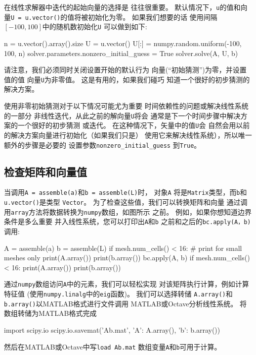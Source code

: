 在线性求解器中迭代的起始向量的选择是
往往很重要。 默认情况下，\texttt{u}的值和向量\texttt{U = u.vector()}的值将被初始化为零。 如果我们想要的话
使用间隔$[ - 100,100]$中的随机数初始化\texttt{U}
可以做到如下:

\begin{python}
n = u.vector().array().size
U = u.vector()
U[:] = numpy.random.uniform(-100, 100, n)
solver.parameters.nonzero_initial_guess = True
solver.solve(A, U, b)
\end{python}
请注意，我们必须同时关闭设置开始的默认行为
向量(``初始猜测'')为零，并设置值的值
向量\texttt{U}为非零值。 这是有用的，如果我们碰巧
知道一个很好的初步猜测的解决方案。

使用非零初始猜测对于以下情况可能尤为重要
时间依赖性的问题或解决线性系统的一部分
非线性迭代，从此之前的解向量\texttt{U}将会
通常是下一个时间步骤中解决方案的一个很好的初步猜测
或迭代。 在这种情况下，矢量中的值\texttt{U}会
自然会用以前的解决方案向量进行初始化（如果我们只是）
使用它来解决线性系统），所以唯一额外的步骤是必要的
设置参数\verb!nonzero_initial_guess! 到\texttt{True}。

\subsection{检查矩阵和向量值}

当调用\texttt{A = assemble(a)}和\texttt{b = assemble(L)}时，
对象\texttt{A}
将是\texttt{Matrix}类型，而\texttt{b}和\texttt{u.vector()}是类型
\texttt{Vector}。 为了检查这些值，我们可以转换矩阵和向量
通过调用\texttt{array}方法将数据转换为\texttt{numpy}数组，如图所示
之前。 例如，如果你想知道边界条件是多么重要
并入线性系统，您可以打印出\texttt{A}和\texttt{b}
之前和之后的\texttt{bc.apply(A，b)}调用:

\begin{python}
A = assemble(a)
b = assemble(L)
if mesh.num_cells() < 16:  # print for small meshes only
    print(A.array())
    print(b.array())
bc.apply(A, b)
if mesh.num_cells() < 16:
    print(A.array())
    print(b.array())
\end{python}

通过\texttt{numpy}数组访问\texttt{A}中的元素，我们可以轻松实现
对该矩阵执行计算，例如计算特征值
(使用\texttt{numpy.linalg}中的\texttt{eig}函数)。 我们可以选择转储
\texttt{A.array()}和\texttt{b.array()}以MATLAB格式进行文件调用
MATLAB或Octave分析线性系统。
将数组转储为MATLAB格式完成


\begin{python}
import scipy.io
scipy.io.savemat('Ab.mat', {'A': A.array(), 'b': b.array()})
\end{python}
然后在MATLAB或Octave中写\texttt{load Ab.mat}
数组变量\texttt{A}和\texttt{b}可用于计算。


